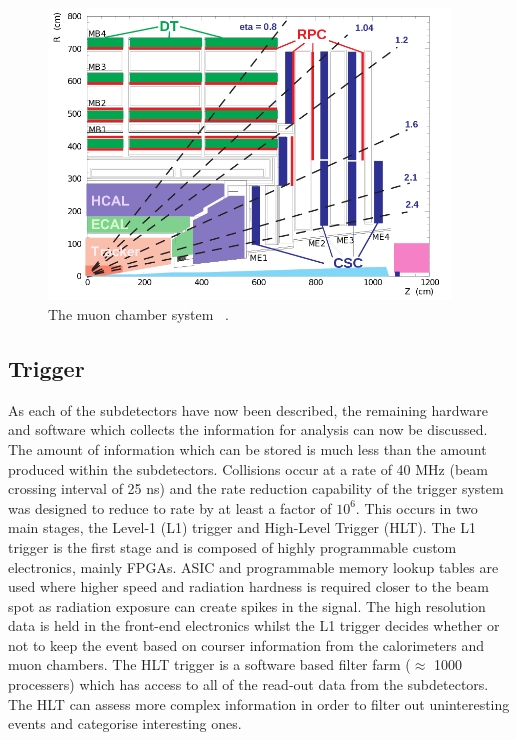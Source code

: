 \begin{figure}[ht!]
\centering
    \includegraphics[width=0.95\textwidth]{images/MuonChambers.png}
    \caption{The muon chamber system ~\cite{Kim:2012ix}.}
    \label{fig:muonchamber}
\end{figure}

\subsection{Trigger}
As each of the subdetectors have now been described, the remaining hardware and software which collects the information for analysis can now be discussed. The amount of information which can be stored is much less than the amount produced within the subdetectors. Collisions occur at a rate of 40 MHz (beam crossing interval of 25 ns) and the rate reduction capability of the trigger system was designed to reduce to rate by at least a factor of $10^6$. This occurs in two main stages, the Level-1 (L1) trigger and High-Level Trigger (HLT). The L1 trigger is the first stage and is composed of highly programmable custom electronics, mainly FPGAs. ASIC and programmable memory lookup tables are used where higher speed and radiation hardness is required closer to the beam spot as radiation exposure can create spikes in the signal. The high resolution data is held in the front-end electronics whilst the L1 trigger decides whether or not to keep the event based on courser information from the calorimeters and muon chambers. The HLT trigger is a software based filter farm ($\approx$ 1000 processers) which has access to all of the read-out data from the subdetectors. The HLT can assess more complex information in order to filter out uninteresting events and categorise interesting ones.

